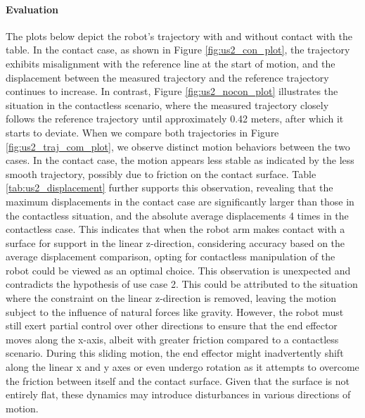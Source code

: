 \documentclass[report.tex]{subfiles}
\begin{document}
    \paragraph{\large{Evaluation}\\}
    The plots below depict the robot's trajectory with and without contact with the table. In the contact case, as shown in Figure \ref{fig:us2_con_plot}, the trajectory exhibits misalignment with the reference line at the start of motion, and the displacement between the measured trajectory and the reference trajectory continues to increase.
    In contrast, Figure \ref{fig:us2_nocon_plot} illustrates the situation in the contactless scenario, where the measured trajectory closely follows the reference trajectory until approximately 0.42 meters, after which it starts to deviate. When we compare both trajectories in Figure \ref{fig:us2_traj_com_plot}, we observe distinct motion behaviors between the two cases.
    In the contact case, the motion appears less stable as indicated by the less smooth trajectory, possibly due to friction on the contact surface. Table \ref{tab:us2_displacement} further supports this observation, revealing that the maximum displacements in the contact case are significantly larger than those in the contactless situation, and the absolute average displacements 4 times in the contactless case.
    This indicates that when the robot arm makes contact with a surface for support in the linear z-direction, considering accuracy based on the average displacement comparison, opting for contactless manipulation of the robot could be viewed as an optimal choice. This observation is unexpected and contradicts the hypothesis of use case 2. This could be attributed to the situation where the constraint on the linear z-direction is removed, leaving the motion subject to the influence of natural forces like gravity. However, the robot must still exert partial control over other directions to ensure that the end effector moves along the x-axis, albeit with greater friction compared to a contactless scenario. During this sliding motion, the end effector might inadvertently shift along the linear x and y axes or even undergo rotation as it attempts to overcome the friction between itself and the contact surface. Given that the surface is not entirely flat, these dynamics may introduce disturbances in various directions of motion.
\end{document}
